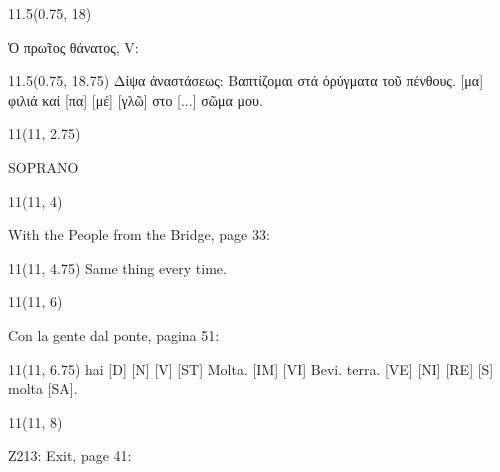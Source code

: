 \documentclass[11pt]{article}
\begin{document}
\begin{textblock}{11.5}(0.75, 18)
\begin{center}
\color{mypink}
Ὁ πρ\~ωτος θάνατος, V:
\end{center}
\end{textblock}

\begin{textblock}{11.5}(0.75, 18.75)
\color{black}
Δίψα ἀναστάσεως: Βαπτίζομαι στά ὀρύγματα τοῦ πένθους. [μα] φιλιά καί [πα] [μέ] [γλῶ] στο [...] σῶμα μου.
\rightskip\leftskip
\end{textblock}


\begin{textblock}{11}(11, 2.75)
\begin{center}
\color{black}
SOPRANO
\end{center}
\end{textblock}

\begin{textblock}{11}(11, 4)
\begin{center}
\color{mypink}
With the People from the Bridge, page 33:
\end{center}
\end{textblock}

\begin{textblock}{11}(11, 4.75)
\color{black}
Same thing every time.
\rightskip\leftskip
\end{textblock}


\begin{textblock}{11}(11, 6)
\begin{center}
\color{mypink}
Con la gente dal ponte, pagina 51:
\end{center}
\end{textblock}

\begin{textblock}{11}(11, 6.75)
\color{black}
hai [D] [N] [V] [ST] Molta. [IM] [VI] Bevi. terra. [VE] [NI] [RE] [S] molta [SA].
\rightskip\leftskip
\end{textblock}

\begin{textblock}{11}(11, 8)
\begin{center}
\color{mypink}
Z213: Exit, page 41:
\end{center}
\end{textblock}
\end{document}
